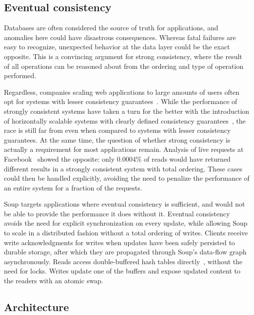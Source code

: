 \subsection{Eventual consistency}

Databases are often considered the source of truth for applications, and
anomalies here could have disastrous consequences. Whereas fatal failures are
easy to recognize, unexpected behavior at the data layer could be the exact
opposite. This is a convincing argument for strong consistency, where the result
of all operations can be reasoned about from the ordering and type of operation
performed.

Regardless, companies scaling web applications to large amounts of users often
opt for systems with lesser consistency guarantees~\cite{dynamo, pnuts, werner}.
While the performance of strongly consistent systems have taken a turn for the
better with the introduction of horizontally scalable systems with clearly defined
consistency guarantees~\cite{spanner, cockroach}, the race is still far from
even when compared to systems with lesser consistency guarantees. At the same
time, the question of whether strong consistency is actually a requirement for
most applications remain. Analysis of live requests at
Facebook~\cite{existential} showed the opposite: only 0.0004\% of reads would
have returned different results in a strongly consistent system with total
ordering. These cases could then be handled explicitly, avoiding the need to
penalize the performance of an entire system for a fraction of the requests.

Soup targets applications where eventual consistency is sufficient, and would
not be able to provide the performance it does without it. Eventual consistency
avoids the need for explicit synchronization on every update, while allowing
Soup to scale in a distributed fashion without a total ordering of writes.
Clients receive write acknowledgments for writes when updates have been safely
persisted to durable storage, after which they are propagated through Soup's
data-flow graph asynchronously. Reads access double-buffered hash tables
directly~\cite{evmap}, without the need for locks. Writes update one of the
buffers and expose updated content to the readers with an atomic swap.

\subsection{Architecture}\label{sec:soup-architecture}

